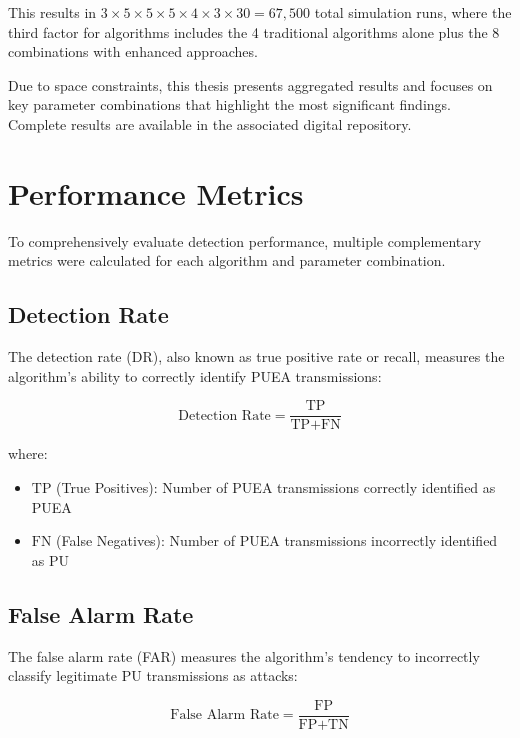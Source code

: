 This results in $3 \times 5 \times 5 \times 5 \times 4 \times 3 \times 30 = 67,500$ total simulation runs, where the third factor for algorithms includes the 4 traditional algorithms alone plus the 8 combinations with enhanced approaches.

Due to space constraints, this thesis presents aggregated results and focuses on key parameter combinations that highlight the most significant findings. Complete results are available in the associated digital repository.

\section{Performance Metrics}

To comprehensively evaluate detection performance, multiple complementary metrics were calculated for each algorithm and parameter combination.

\subsection{Detection Rate}

The detection rate (DR), also known as true positive rate or recall, measures the algorithm's ability to correctly identify PUEA transmissions:

\begin{equation}
    \text{Detection Rate} = \frac{\text{TP}}{\text{TP} + \text{FN}}
\end{equation}

\noindent where:
\begin{itemize}
    \item $\text{TP}$ (True Positives): Number of PUEA transmissions correctly identified as PUEA
    \item $\text{FN}$ (False Negatives): Number of PUEA transmissions incorrectly identified as PU
\end{itemize}

\subsection{False Alarm Rate}

The false alarm rate (FAR) measures the algorithm's tendency to incorrectly classify legitimate PU transmissions as attacks:

\begin{equation}
    \text{False Alarm Rate} = \frac{\text{FP}}{\text{FP} + \text{TN}}
\end{equation}

